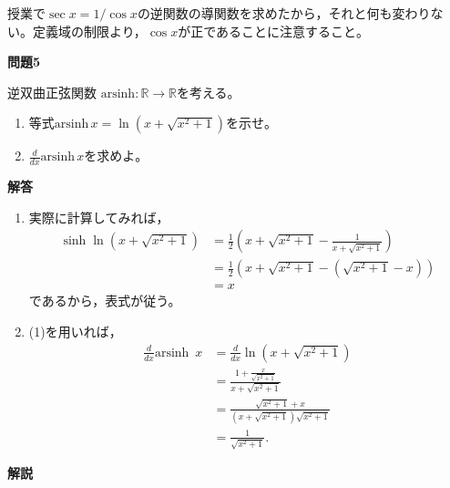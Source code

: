 \documentclass[a4paper,12pt,dvipdfmx,fleqn, oneside]{jsarticle}
\theoremstyle{defstyle}
\theoremstyle{thmx}
\theoremstyle{qesstyle}
\begin{document}
授業で$\sec x = 1/ \cos x$の逆関数の導関数を求めたから，それと何も変わりない。定義域の制限より，$\cos x$が正であることに注意すること。

\begin{shadebox}
    \textbf{問題5}

    逆双曲正弦関数 $\text{arsinh} : \mathbb{R} \rightarrow \mathbb{R}$を考える。
    \begin{enumerate}
        \item 等式$\text{arsinh}\, x = \ln(x+\sqrt{x^2+1})$を示せ。
        \item $\frac{d}{dx} \text{arsinh} \, x$を求めよ。
    \end{enumerate}
\end{shadebox}

\begin{screen}
    \textbf{解答}

    \begin{enumerate}
        \item 実際に計算してみれば，
              \begin{align*}
                  \sinh \ln (x + \sqrt{x^2 + 1}) & = \frac{1}{2}\left(x + \sqrt{x^2 +1 } - \frac{1}{x+ \sqrt{x^2 + 1}}\right) \\
                                                 & = \frac{1}{2}(x + \sqrt{x^2 + 1} - (\sqrt{x^2 + 1}-x))                     \\
                                                 & = x
              \end{align*}
              であるから，表式が従う。
        \item (1)を用いれば，
              \begin{align*}
                  \frac{d}{dx} \text{arsinh }\, x & = \frac{d}{dx} \ln (x + \sqrt{x^2+1})                         \\
                                                  & = \frac{1+\frac{x}{\sqrt{x^2+1}}}{x+\sqrt{x^2+1}}             \\
                                                  & = \frac{\sqrt{x^2 + 1} + x}{(x + \sqrt{x^2+1})\sqrt{x^2 + 1}} \\
                                                  & = \frac{1}{\sqrt{x^2+1}}.
              \end{align*}
    \end{enumerate}
\end{screen}

\textbf{解説}
\end{document}
